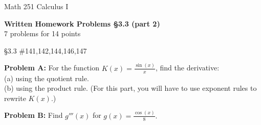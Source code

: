 \documentclass[11pt]{report}
\theoremstyle{plain}
\begin{document}
\hfill Math 251 Calculus I
\begin{center}
\Large{\textbf{Written Homework Problems \S 3.3 (part 2)}} \\
7 problems for 14 points\\
\end{center}

\begin{description}
\item{\S 3.3} \#141,142,144,146,147

\item{\textbf{Problem A: }} For the function $K(x) = \frac{\sin(x)}{x}$, find the derivative:\\

(a) using the quotient rule.\\

(b) using the product rule. (For this part, you will have to use exponent rules to rewrite $K(x).$)\\

\item{\textbf{Problem B: }} Find $g'''(x)$ for $g(x)=\frac{\cos(x)}{8}.$\\

\end{description}
\end{document}
